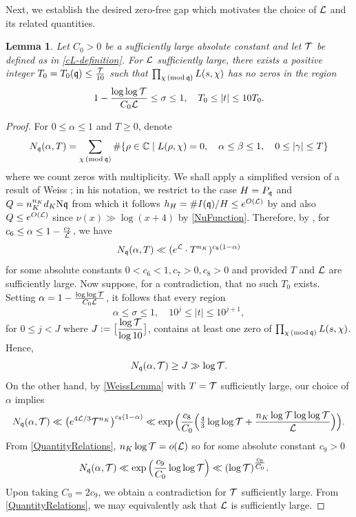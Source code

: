 \documentclass[12pt,psamsfonts]{amsart}
\newtheorem{lem}[thm]{Lemma}
\theoremstyle{definition}
\theoremstyle{remark}
\numberwithin{equation}{section}
\newcounter{notation}
\begin{document}
Next, we establish the desired zero-free gap which motivates the choice of $\mathcal{L}$ and its related quantities.
\begin{lem} \label{ZeroGap} Let $C_0 >0 $ be a sufficiently large absolute constant and let $\mathcal{T}$ be defined as in \eqref{cL-definition}. For $\mathcal{L}$ sufficiently large, there exists a positive integer  $T_0 = T_0(\mathfrak{q}) \leq \frac{ \mathcal{T} }{10}$ such that $\prod_{\chi \, (\mathrm{mod} {\, \mathfrak{q}})}L(s,\chi)$ has no zeros in the region
\[
1-\frac{\log\log\mathcal{T}}{C_0\mathcal{L}} \leq \sigma \leq 1, \quad T_0 \leq |t| \leq 10T_0.
\]
\end{lem}
\begin{proof} For $0 \leq \alpha \leq 1$ and $T \geq 0$, denote
\[
N_{\mathfrak{q}}(\alpha, T) =  \sum_{\chi \, (\mathrm{mod} {\, \mathfrak{q}})} \#\{ \rho \in \mathbb{C} \mid L(\rho, \chi) = 0, \quad \alpha \leq \beta \leq 1, \quad 0 \leq |\gamma| \leq T \}
\]
where we count zeros with multiplicity. 
We shall apply a simplified version of a result of Weiss \cite[Theorem 4.3]{Weiss}; in his notation, we restrict to the case $H = P_{\mathfrak{q}}$ and $Q = n_K^{n_K}d_K\mathrm{N}\mathfrak{q}$ from which it follows $h_H = \#I(\mathfrak{q})/H \leq e^{O(\mathcal{L})}$ by \cite[Lemma 1.16]{Weiss} and also $Q \leq e^{O(\mathcal{L})}$ since $\nu(x) \gg \log(x+4)$ by \eqref{NuFunction}. Therefore, by \cite[Theorem 4.3]{Weiss}, for $c_6 \leq \alpha \leq 1- \frac{c_7}{\mathcal{L}}$, we have
\begin{equation}
N_{\mathfrak{q}}(\alpha,T) \ll  ( e^{\mathcal{L}} \cdot T^{n_K})^{c_8(1-\alpha)}
\label{WeissLemma}
\end{equation}
 for some absolute constants $0 < c_6 < 1, c_7 > 0, c_8 >0$ and provided $T$ and $\mathcal{L}$ are sufficiently large. Now suppose, for a contradiction, that no such $T_0$ exists. Setting $\alpha = 1- \frac{\log\log \mathcal{T}}{C_0\mathcal{L}}$, it follows that every region
\[
\alpha \leq \sigma \leq 1, \quad 10^j \leq |t| \leq 10^{j+1},
\]
for $0 \leq j < J$ where $J := \big[ \dfrac{\log \mathcal{T}}{\log 10} \big]$, contains at least one zero of $\prod_{\chi \, (\mathrm{mod} {\, \mathfrak{q}})} L(s,\chi)$. Hence,
\[
N_{\mathfrak{q}}(\alpha, \mathcal{T}) \geq J \gg \log \mathcal{T}. 
\]
On the other hand, by \eqref{WeissLemma} with $T = \mathcal{T}$ sufficiently large, our choice of $\alpha$ implies
\[
N_{\mathfrak{q}}(\alpha, \mathcal{T})  \ll \big( e^{4\mathcal{L}/3} \mathcal{T}^{n_K} \big)^{c_8(1-\alpha)} \ll \exp\Big( \frac{c_8}{C_0} \Big( \tfrac{4}{3} \log\log \mathcal{T} + \frac{n_K \log \mathcal{T} \log\log \mathcal{T}}{\mathcal{L}}\Big) \Big).
\]
From \cref{QuantityRelations}, $n_K \log \mathcal{T} = o(\mathcal{L})$ so for some absolute constant $c_9 > 0$ 
\begin{align*}
N_{\mathfrak{q}}(\alpha, \mathcal{T}) & \ll \exp\Big( \frac{c_9}{C_0} \log\log \mathcal{T} \Big) \ll (\log \mathcal{T})^{ \tfrac{c_9}{C_0}}.
\end{align*}
Upon taking $C_0 = 2c_9$, we obtain a contradiction for $\mathcal{T}$ sufficiently large. From \cref{QuantityRelations}, we may equivalently ask that $\mathcal{L}$ is sufficiently large. 
\end{proof}
\end{document}
